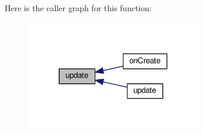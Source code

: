 Here is the caller graph for this function\+:
\nopagebreak
\begin{figure}[H]
\begin{center}
\leavevmode
\includegraphics[width=218pt]{a00006_ac5c54df7ed3b930268c8d7752c101725_icgraph}
\end{center}
\end{figure}




